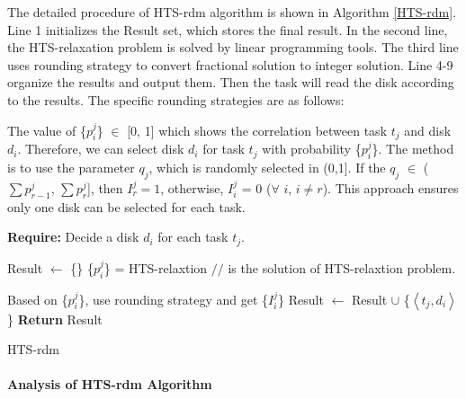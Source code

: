 \documentclass[conference]{IEEEtran}
\begin{document}
 The detailed procedure of HTS-rdm algorithm is shown in Algorithm \ref{HTS-rdm}. Line 1 initializes the Result set, which stores the final result. In the second line, the HTS-relaxation problem is solved by linear programming tools. The third line uses rounding strategy to convert fractional solution to integer solution. Line 4-9 organize the results and output them. Then the task will read the disk according to the results. The specific rounding strategies are as follows:
 
 The value of \{$p_i^j$\}  $\in$ [0, 1] which shows the correlation between task $t_j$ and disk $d_i$. Therefore, we can select disk $d_i$ for task $t_j$ with  probability \{$p_i^j$\}. The method is to use the parameter $q_j$, which is randomly selected in (0,1]. If the $q_j$ $\in$ ($\sum p_{r-1}^{j}$, $\sum p_{r}^{j}$], then $I_r^j = 1$, otherwise, $I_i^j$ = 0 ($\forall$ $i$, $i \ne r$). This approach ensures only one disk can be selected for each task.%
 \begin{algorithm}
 	
 	\textbf{Require:} Decide a disk $d_i$ for each task $t_j$. %
 	\begin{algorithmic}[1]
 		
 		\State Result $\gets$ \{\}
 		\State \{$p_i^j$\} = HTS-relaxtion		
 		$//$ is the solution of HTS-relaxtion problem. 
 		
 		\State Based on \{$p_i^j$\}, use rounding strategy and get \{$I_i^j$\}
 			\State Result $\gets$ Result $\cup$ 	
 			\{$\left \langle t_j, d_i\right \rangle$\}
 			\EndIf
 		\EndFor	
 		\State \textbf{Return} Result	
 	\end{algorithmic}
 	\caption{HTS-rdm}\label{HTS-rdm}
 \end{algorithm}

\paragraph{\textbf{Analysis of HTS-rdm Algorithm}}
\end{document}
